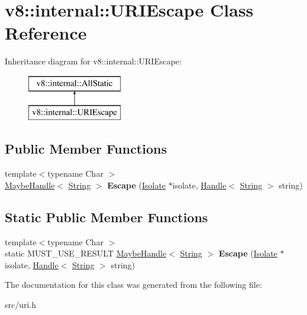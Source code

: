 \hypertarget{classv8_1_1internal_1_1_u_r_i_escape}{}\section{v8\+:\+:internal\+:\+:U\+R\+I\+Escape Class Reference}
\label{classv8_1_1internal_1_1_u_r_i_escape}
Inheritance diagram for v8\+:\+:internal\+:\+:U\+R\+I\+Escape\+:\begin{figure}[H]
\begin{center}
\leavevmode
\includegraphics[height=2.000000cm]{classv8_1_1internal_1_1_u_r_i_escape}
\end{center}
\end{figure}
\subsection*{Public Member Functions}
\begin{DoxyCompactItemize}
\item 
\hypertarget{classv8_1_1internal_1_1_u_r_i_escape_a23519a808847f598bfbe9adb20bff0bb}{}{\footnotesize template$<$typename Char $>$ }\\\hyperlink{classv8_1_1internal_1_1_maybe_handle}{Maybe\+Handle}$<$ \hyperlink{classv8_1_1internal_1_1_string}{String} $>$ {\bfseries Escape} (\hyperlink{classv8_1_1internal_1_1_isolate}{Isolate} $\ast$isolate, \hyperlink{classv8_1_1internal_1_1_handle}{Handle}$<$ \hyperlink{classv8_1_1internal_1_1_string}{String} $>$ string)\label{classv8_1_1internal_1_1_u_r_i_escape_a23519a808847f598bfbe9adb20bff0bb}

\end{DoxyCompactItemize}
\subsection*{Static Public Member Functions}
\begin{DoxyCompactItemize}
\item 
\hypertarget{classv8_1_1internal_1_1_u_r_i_escape_aac6157301228918a3dd52ac61502b8a8}{}{\footnotesize template$<$typename Char $>$ }\\static M\+U\+S\+T\+\_\+\+U\+S\+E\+\_\+\+R\+E\+S\+U\+L\+T \hyperlink{classv8_1_1internal_1_1_maybe_handle}{Maybe\+Handle}$<$ \hyperlink{classv8_1_1internal_1_1_string}{String} $>$ {\bfseries Escape} (\hyperlink{classv8_1_1internal_1_1_isolate}{Isolate} $\ast$isolate, \hyperlink{classv8_1_1internal_1_1_handle}{Handle}$<$ \hyperlink{classv8_1_1internal_1_1_string}{String} $>$ string)\label{classv8_1_1internal_1_1_u_r_i_escape_aac6157301228918a3dd52ac61502b8a8}

\end{DoxyCompactItemize}


The documentation for this class was generated from the following file\+:\begin{DoxyCompactItemize}
\item 
src/uri.\+h\end{DoxyCompactItemize}
